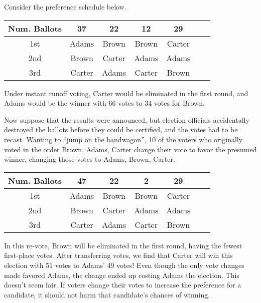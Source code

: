\begin{example}
  Consider the preference schedule below.
  \begin{center}
    \begin{tabular}[h]{ccccccc}
      \toprule
      Num. Ballots & 37 & 22 & 12 & 29 \\
      \midrule
      1st & Adams & Brown & Brown & Carter \\
      2nd & Brown & Carter & Adams & Adams \\
      3rd & Carter & Adams & Carter & Brown \\
      \bottomrule
    \end{tabular}
  \end{center}
  Under instant runoff voting, Carter would be eliminated in the first
  round, and Adams would be the winner with 66 votes to 34 votes for
  Brown.

  Now suppose that the results were announced, but election officials
  accidentally destroyed the ballots before they could be certified,
  and the votes had to be recast. Wanting to ``jump on the bandwagon'',
  10 of the voters who originally voted in the order Brown, Adams,
  Carter change their vote to favor the presumed winner, changing
  those votes to Adams, Brown, Carter.
  \begin{center}
    \begin{tabular}[h]{ccccccc}
      \toprule
      Num. Ballots & 47 & 22 & 2 & 29 \\
      \midrule
      1st & Adams & Brown & Brown & Carter \\
      2nd & Brown & Carter & Adams & Adams \\
      3rd & Carter & Adams & Carter & Brown \\
      \bottomrule
    \end{tabular}
  \end{center}
  In this re-vote, Brown will be eliminated in the first round, having
  the fewest first-place votes. After transferring votes, we find that
  Carter will win this election with 51 votes to Adams' 49 votes! Even
  though the only vote changes made favored Adams, the change ended up
  costing Adams the election. This doesn't seem fair. If voters change
  their votes to increase the preference for a candidate, it should
  not harm that candidate's chances of winning.
\end{example}

\newpage

